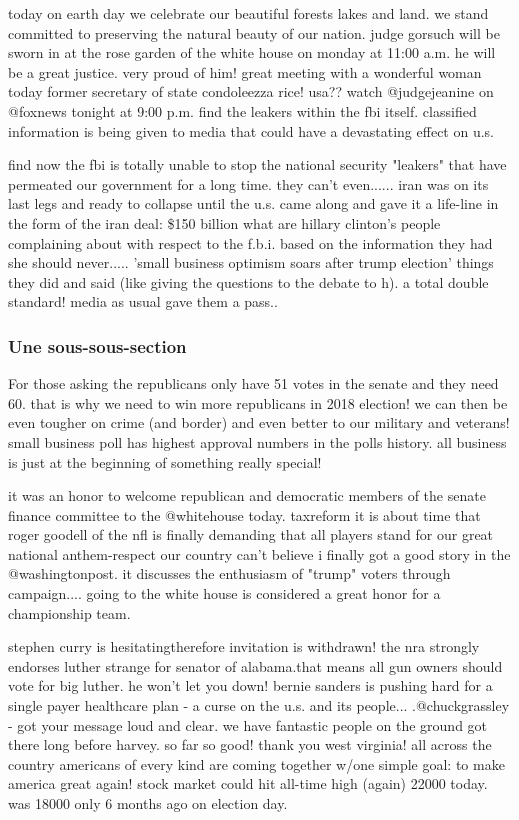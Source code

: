\documentclass[10pt,twoside,fleqn,english,french]{actuecon}
\begin{document}
		today on earth day we celebrate our beautiful forests lakes and land. we stand committed to preserving the natural
		beauty of our nation. judge gorsuch will be sworn in at the rose garden of the white house on monday at 11:00 a.m. he will
		be a great justice. very proud of him! great meeting with a wonderful woman today former secretary of state condoleezza
		rice! usa?? watch @judgejeanine on @foxnews tonight at 9:00 p.m. find the leakers within the fbi itself. classified
		information is being given to media that could have a devastating effect on u.s. 
		
		find now the fbi is totally unable to stop
		the national security "leakers" that have permeated our government for a long time. they can't even...... iran was on its
		last legs and ready to collapse until the u.s. came along and gave it a life-line in the form of the iran deal: \$150
		billion what are hillary clinton's people complaining about with respect to the f.b.i. based on the information they had
		she should never..... 'small business optimism soars after trump election' things they did and said (like giving the
		questions to the debate to h). a total double standard! media as usual gave them a pass..
						 
		\subsubsection{Une sous-sous-section}
		
		For those asking the republicans only have 51 votes in the senate and they need 60. that is why we need to win more
		republicans in 2018 election! we can then be even tougher on crime (and border) and even better to our military and veterans!
		small business poll has highest approval numbers in the polls history. all business is just at the beginning of something
		really special! 
		
		it was an honor to welcome republican and democratic members of the senate finance committee to the
		@whitehouse today. taxreform it is about time that roger goodell of the nfl is finally demanding that all players stand
		for our great national anthem-respect our country can't believe i finally got a good story in the @washingtonpost. it
		discusses the enthusiasm of "trump" voters through campaign.... going to the white house is considered a great honor for a
		championship team.
		
		stephen curry is hesitatingtherefore invitation is withdrawn! the nra strongly endorses luther strange
		for senator of alabama.that means all gun owners should vote for big luther. he won't let you down! bernie sanders is
		pushing hard for a single payer healthcare plan - a curse on the u.s. and its people... .@chuckgrassley - got your message
		loud and clear. we have fantastic people on the ground got there long before harvey. so far so good! thank you west
		virginia! all across the country americans of every kind are coming together w/one simple goal: to make america great
		again! stock market could hit all-time high (again) 22000 today. was 18000 only 6 months ago on election day.
		
\end{document}
